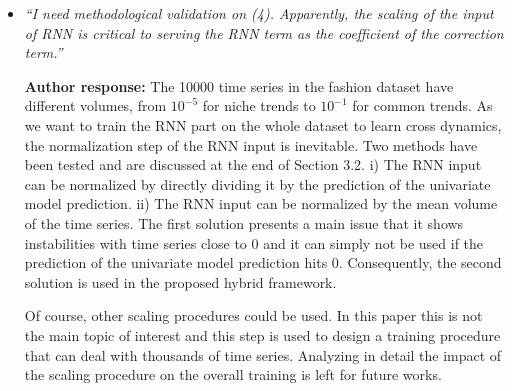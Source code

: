 \documentclass[10pt]{article} %
\begin{document}
\begin{itemize}
	\item {\em ``I need methodological validation on (4). Apparently, the scaling of the input of RNN is critical to serving the RNN term as the coefficient of the correction term.''} \medskip
	
	\textbf{Author response:} The 10000 time series in the fashion dataset have different volumes, from $10^{-5}$ for niche trends to $10^{-1}$ for common trends. As we want to train the RNN part on the whole dataset to learn cross dynamics, the normalization step of the RNN input is inevitable. Two methods have been tested and are discussed at the end of Section 3.2. i) The RNN input can be normalized by directly dividing it by the prediction of the univariate model prediction. ii) The RNN input can be normalized by the mean volume of the time series. The first solution presents a main issue that it shows instabilities with time series close to 0 and it can simply not be used if the prediction of the univariate model prediction hits 0. Consequently, the second solution is used in the proposed hybrid framework. 

Of course, other scaling procedures could be used. In this paper this is not the main topic of interest and this step is used to design a training procedure that can deal with thousands of time series. Analyzing in detail the impact of the scaling procedure on the overall training is left for future works.\\
\end{itemize}
\end{document}
